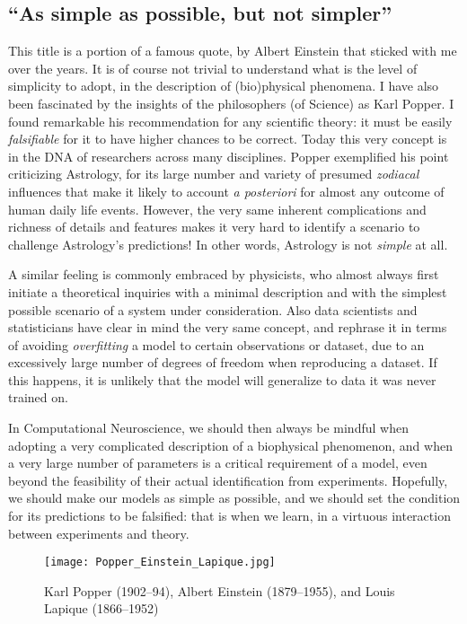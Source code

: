 \subsection{``As simple as possible, but not simpler''}
This title is a portion of a famous quote, by Albert Einstein that sticked with me over the years. It is of course not trivial to understand what is the level of simplicity to adopt, in the description of (bio)physical phenomena. I have also been fascinated by the insights of the philosophers (of Science) as Karl Popper. I found remarkable his recommendation for any scientific theory: it must be easily \textit{falsifiable} for it  to have higher chances to be correct. Today this very concept is in the DNA of researchers across many disciplines. Popper exemplified his point criticizing Astrology, for its large number and variety of presumed \textit{zodiacal} influences that make it likely to account \textit{a posteriori} for almost any outcome of human daily life events. However, the very same inherent complications and richness of details and features makes it very hard to identify a scenario to challenge Astrology's predictions! In other words, Astrology is not \textit{simple} at all.

A similar feeling is commonly embraced by physicists, who almost always first initiate a theoretical inquiries with a minimal description and with the simplest possible scenario of a system under consideration. Also data scientists and statisticians have clear in mind the very same concept, and rephrase it in terms of avoiding \textit{overfitting} a model to certain observations or dataset, due to an excessively large number of degrees of freedom when reproducing a dataset. If this happens, it is unlikely that the model will generalize to data it was never trained on.


In Computational Neuroscience, we should then always be mindful when adopting a very complicated description of a biophysical phenomenon, and when a very large number of parameters is a critical requirement of a model, even beyond the feasibility of their actual identification from experiments. Hopefully, we should make our models as simple as possible, and we should set the condition for its predictions to be falsified: that is when we learn, in a virtuous interaction between experiments and theory.

\begin{figure}[t]
	\sidecaption[t]
	\centering
	\texttt{[image: Popper\_Einstein\_Lapique.jpg]}
	\caption{Karl Popper (1902--94), Albert Einstein (1879--1955), and Louis Lapique (1866--1952)}
	\label{fig3:PopperEinsteinLapique}       %
	\end{figure}



